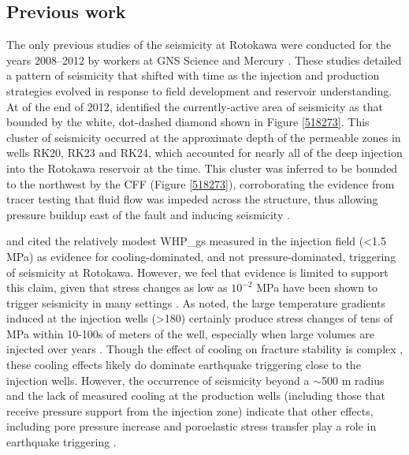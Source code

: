 \subsection{Previous work}
The only previous studies of the seismicity at Rotokawa were conducted for the years 2008--2012 by workers at GNS Science and Mercury \citep{Sherburn_2015,Sewell_2015WGC}. These studies detailed a pattern of seismicity that shifted with time as the injection and production strategies evolved in response to field development and reservoir understanding. At of the end of 2012, \citet{Sherburn_2015} identified the currently-active area of seismicity as that bounded by the white, dot-dashed diamond shown in Figure \ref{518273}. This cluster of seismicity occurred at the approximate depth of the permeable zones in wells RK20, RK23 and RK24, which accounted for nearly all of the deep injection into the Rotokawa reservoir at the time. This cluster was inferred to be bounded to the northwest by the \acrshort{CFF} (Figure \ref{518273}), corroborating the evidence from tracer testing that fluid flow was impeded across the structure, thus allowing pressure buildup east of the fault and inducing seismicity \citep{Sherburn_2015,Sewell_2015WGC}. 

\citet{Sherburn_2015} and \citet{Sewell_2015WGC} cited the relatively modest \glspl{WHP_g} measured in the injection field (\textless1.5 MPa) as evidence for cooling-dominated, and not pressure-dominated, triggering of seismicity at Rotokawa. However, we feel that evidence is limited to support this claim, given that stress changes as low as $10^{-2}$ MPa have been shown to trigger seismicity in many settings \citep[][]{stein1999role,keranen2018induced}. As \citet{Sewell_2015WGC} noted, the large temperature gradients induced at the injection wells (\textgreater180) certainly produce stress changes of tens of MPa within 10-100s of meters of the well, especially when large volumes are injected over years \citep{stephens1982hydraulic}. Though the effect of cooling on fracture stability is complex \citep{Jeanne_2015deformation}, these cooling effects likely do dominate earthquake triggering close to the injection wells. However, the occurrence of seismicity beyond a $\sim${500} m radius and the lack of measured cooling at the production wells (including those that receive pressure support from the injection zone) indicate that other effects, including pore pressure increase and poroelastic stress transfer play a role in earthquake triggering \citep{Schoenball_2012}.

